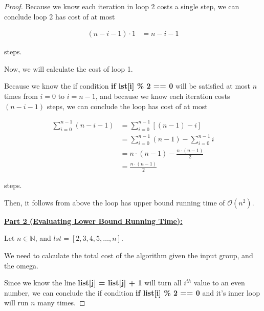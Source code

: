 \documentclass[12pt]{article}
\begin{document}
\begin{enumerate}[a.]
\begin{proof}
        Because we know each iteration in loop 2 costs a single step, we can conclude
        loop 2 has cost of at most

        \begin{align}
            (n - i - 1) \cdot 1 &= n - i - 1
        \end{align}

        steps.

        \bigskip

        Now, we will calculate the cost of loop 1.

        \bigskip

        Because we know the if condition \textbf{if lst[i] \% 2 == 0} will be satisfied
        at most $n$ times from $i = 0$ to $i = n - 1$, and because we know each
        iteration costs $(n - i - 1)$ steps, we can conclude the loop has cost of at most

        \begin{align}
            \sum\limits_{i=0}^{n-1} (n-i-1) &= \sum\limits_{i=0}^{n-1} \left[ (n-1) - i \right]\\
            &= \sum\limits_{i=0}^{n-1} (n-1) - \sum\limits_{i=0}^{n-1} i\\
            &= n \cdot (n-1) - \frac{n \cdot (n-1)}{2}\\
            &= \frac{n \cdot (n-1)}{2}
        \end{align}

        steps.

        \bigskip

        Then, it follows from above the loop has upper bound running time of
        $\mathcal{O}(n^2)$.

        \bigskip

        \underline{\textbf{Part 2 (Evaluating Lower Bound Running Time):}}

        \bigskip

        Let $n \in \mathbb{N}$, and $lst = [2,3,4,5,\dots,n]$.

        \bigskip

        We need to calculate the total cost of the algorithm given the input group,
        and the omega.

        \bigskip

        Since we know the line \textbf{list[j] = list[j] + 1} will turn all $i^{th}$
        value to an even number, we can conclude the if condition \textbf{if list[i] \% 2 == 0}
        and it's inner loop will run $n$ many times.


\end{proof}
\end{enumerate}
\end{document}
